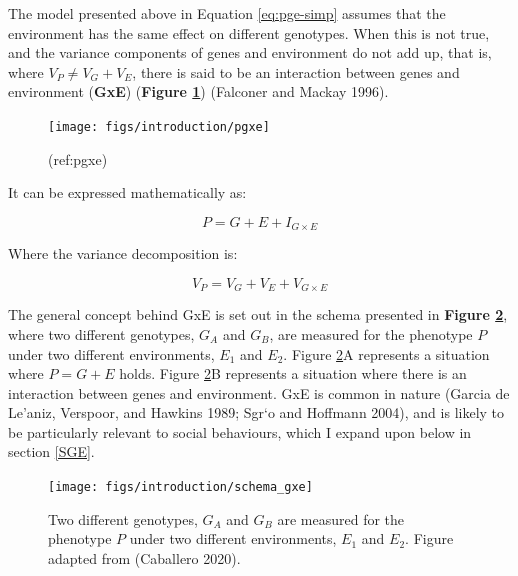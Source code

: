 \documentclass[
]{book}
\begin{document}
The model presented above in Equation \eqref{eq:pge-simp} assumes that the environment has the same effect on different genotypes. When this is not true, and the variance components of genes and environment do not add up, that is, where \(V_{P} \neq V_{G} + V_{E}\), there is said to be an interaction between genes and environment (\textbf{GxE}) (\textbf{Figure \ref{fig:pgxe}}) (Falconer and Mackay 1996).

\begin{figure}

{\centering \texttt{[image: figs/introduction/pgxe]} 

}

\caption{(ref:pgxe)}\label{fig:pgxe}
\end{figure}

It can be expressed mathematically as:

\begin{equation}
P = G + E + I_{G\times E} \label{eq:gbye}
\end{equation}

Where the variance decomposition is:

\begin{equation}
V_P = V_G + V_E + V_{G\times E} \label{eq:gbyedecomp}
\end{equation}

The general concept behind GxE is set out in the schema presented in \textbf{Figure \ref{fig:schema-gxe}}, where two different genotypes, \(G_A\) and \(G_B\), are measured for the phenotype \(P\) under two different environments, \(E_1\) and \(E_2\). Figure \ref{fig:schema-gxe}A represents a situation where \(P = G + E\) holds. Figure \ref{fig:schema-gxe}B represents a situation where there is an interaction between genes and environment. GxE is common in nature (Garcia de Le'aniz, Verspoor, and Hawkins 1989; Sgr`o and Hoffmann 2004), and is likely to be particularly relevant to social behaviours, which I expand upon below in section \ref{SGE}.



\begin{figure}

{\centering \texttt{[image: figs/introduction/schema\_gxe]} 

}

\caption{Two different genotypes, \(G_A\) and \(G_B\) are measured for the phenotype \(P\) under two different environments, \(E_1\) and \(E_2\). Figure adapted from (Caballero 2020).}\label{fig:schema-gxe}
\end{figure}
\end{document}
